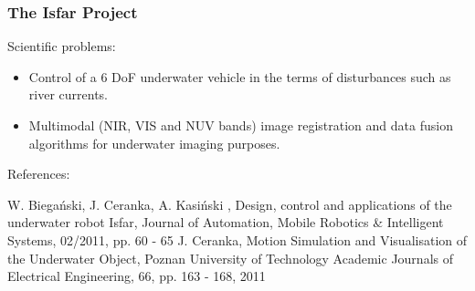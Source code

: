 \documentclass[t,compress]{beamer}
\begin{document}
\begin{frame}
	\frametitle{The Isfar Project}
	Scientific problems:\\
	\begin{itemize}
		\item Control of a 6 DoF underwater vehicle in the terms of disturbances such as river currents.
		\item Multimodal (NIR, VIS and NUV bands) image registration and data fusion algorithms for underwater imaging purposes.
	\end{itemize}
	References:\\
	\begin{scriptsize}
	
	\begin{thebibliography}{99}
		 W. Biega\'nski, J. Ceranka, A. Kasi\'nski , Design, control and applications of the underwater robot Isfar, Journal of Automation, Mobile Robotics \& Intelligent Systems, 02/2011, pp. 60 - 65
		 J. Ceranka, Motion Simulation and Visualisation of the Underwater Object, Poznan University of Technology Academic Journals of Electrical Engineering, 66, pp. 163 - 168, 2011
	\end{thebibliography}
\end{scriptsize}
\end{frame}
\end{document}
